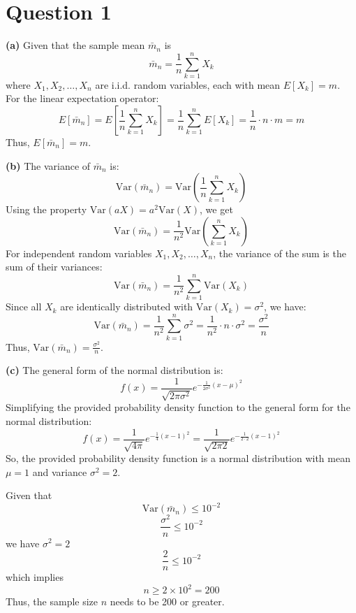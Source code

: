 \documentclass{article}
\begin{document}
\section{Question 1}
\textbf{(a)} Given that the sample mean \(\bar{m}_n\) is
\[
\bar{m}_n = \frac{1}{n} \sum_{k=1}^{n} X_k
\]
where \(X_1, X_2, \dots, X_n\) are i.i.d. random variables, each with mean \(E[X_k] = m\). 
For the linear expectation operator:
\[
E[\bar{m}_n] = E\left[\frac{1}{n} \sum_{k=1}^{n} X_k\right] = \frac{1}{n} \sum_{k=1}^{n} E[X_k] = \frac{1}{n} \cdot n \cdot m = m
\]
Thus, \(E[\bar{m}_n] = m\).

\vspace{1em} %

\textbf{(b)} The variance of \(\bar{m}_n\) is:
\[
\text{Var}(\bar{m}_n) = \text{Var}\left(\frac{1}{n} \sum_{k=1}^{n} X_k\right)
\]
Using the property \(\text{Var}(aX) = a^2 \text{Var}(X)\), we get
\[
\text{Var}(\bar{m}_n) = \frac{1}{n^2} \text{Var}\left(\sum_{k=1}^{n} X_k\right)
\]
For independent random variables \(X_1, X_2, \dots, X_n\), the variance of the sum is the sum of their variances:
\[
\text{Var}(\bar{m}_n) = \frac{1}{n^2} \sum_{k=1}^{n} \text{Var}(X_k)
\]
Since all \(X_k\) are identically distributed with \(\text{Var}(X_k) = \sigma^2\), we have:
\[
\text{Var}(\bar{m}_n) = \frac{1}{n^2} \sum_{k=1}^{n} \sigma^2 = \frac{1}{n^2} \cdot n \cdot \sigma^2 = \frac{\sigma^2}{n}
\]
Thus, \(\text{Var}(\bar{m}_n) = \frac{\sigma^2}{n}\).

\vspace{1em} %

\textbf{(c)} The general form of the normal distribution is:
\[
f(x) = \frac{1}{\sqrt{2 \pi \sigma^2}} e^{-\frac{1}{2 \sigma^2} (x - \mu)^2}
\]
Simplifying the provided probability density function to the general form for the normal distribution:
\[
f(x) = \frac{1}{\sqrt{4 \pi}} e^{-\frac{1}{4} (x - 1)^2} = \frac{1}{\sqrt{2 \pi 2}} e^{-\frac{1}{2 \cdot 2} (x - 1)^2}
\]
So, the provided probability density function is a normal distribution with mean \(\mu = 1\) and variance \(\sigma^2 = 2\).

Given that
\[
\text{Var}(\bar{m}_n) \leq 10^{-2}
\]
\[
\frac{\sigma^2}{n} \leq 10^{-2}
\]
we have ${\sigma^2 =2}$
\[
\frac{2}{n} \leq 10^{-2}
\]
which implies
\[
n \geq 2 \times 10^2 = 200
\]
Thus, the sample size \(n\) needs to be 200 or greater.
\end{document}
